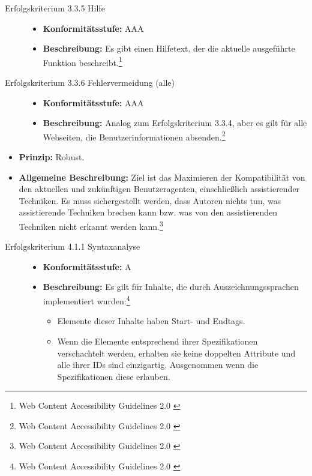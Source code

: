 \begin{description}
\begin{description}
		\item[Erfolgskriterium 3.3.5 Hilfe]\hfill
		\begin{itemize}
			\item \textbf{Konformitätsstufe:} AAA
			\item \textbf{Beschreibung:} Es gibt einen Hilfetext, der die aktuelle ausgeführte Funktion beschreibt.\footnote{Web Content Accessibility Guidelines 2.0 \cite{WCAG2.0}}
		\end{itemize}
		
		\item[Erfolgskriterium 3.3.6 Fehlervermeidung (alle)]\hfill
		\begin{itemize}
			\item \textbf{Konformitätsstufe:} AAA
			\item \textbf{Beschreibung:} Analog zum Erfolgskriterium 3.3.4, aber es gilt für alle Webseiten, die Benutzerinformationen 
			absenden.\footnote{Web Content Accessibility Guidelines 2.0 \cite{WCAG2.0}}
		\end{itemize}
	\end{description}

	\item[Richtlinie 4.1 Kompatibel]\hfill
	\begin{itemize}
		\item \textbf{Prinzip:} Robust.
		\item \textbf{Allgemeine Beschreibung:} Ziel ist das Maximieren der Kompatibilität von den aktuellen und zukünftigen Benutzeragenten, 
		einschließlich assistierender Techniken. Es muss sichergestellt werden, dass Autoren nichts tun, was assistierende Techniken brechen kann bzw. 
		was von den assistierenden Techniken nicht erkannt werden kann.\footnote{Web Content Accessibility Guidelines 2.0 \cite{WCAG2.0}}
	\end{itemize}
	
	\begin{description}
		\item[Erfolgskriterium 4.1.1 Syntaxanalyse]\hfill
		\begin{itemize}
			\item \textbf{Konformitätsstufe:} A
			\item \textbf{Beschreibung:} Es gilt für Inhalte, die durch Auszeichnungssprachen implementiert wurden:\footnote{Web Content Accessibility Guidelines 2.0 \cite{WCAG2.0}}
			\begin{itemize}
				\item Elemente dieser Inhalte haben Start- und Endtags.
				\item Wenn die Elemente entsprechend ihrer Spezifikationen verschachtelt werden, erhalten sie keine doppelten Attribute und alle ihrer
				 IDs sind einzigartig. Ausgenommen wenn die Spezifikationen diese erlauben.
			\end{itemize}
		\end{itemize}
		

\end{description}
\end{description}
